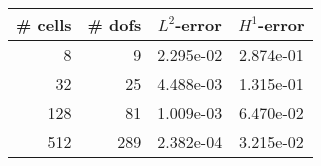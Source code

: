 \documentclass[10pt]{report}
\begin{document}
\begin{table}[H]
\begin{center}
\begin{tabular}{|r|r|c|c|} \hline
\# cells & \# dofs & $L^2$-error & $H^1$-error\\ \hline
8 & 9 & 2.295e-02 & 2.874e-01\\ \hline
32 & 25 & 4.488e-03 & 1.315e-01\\ \hline
128 & 81 & 1.009e-03 & 6.470e-02\\ \hline
512 & 289 & 2.382e-04 & 3.215e-02\\ \hline
\end{tabular}
\end{center}
\end{table}
\end{document}
